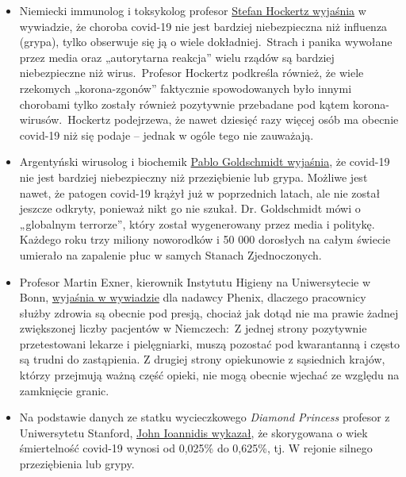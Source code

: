\begin{itemize}
\tightlist
\item
  Niemiecki immunolog i toksykolog profesor
  \href{https://www.youtube.com/watch?v=7wfb-B0BWmo}{Stefan Hockertz
  wyjaśnia} w wywiadzie, że choroba covid-19 nie jest bardziej
  niebezpieczna niż influenza (grypa), tylko obserwuje się ją o wiele
  dokładniej.~Strach i panika wywołane przez media oraz „autorytarna
  reakcja'' wielu rządów są bardziej niebezpieczne niż wirus.~Profesor
  Hockertz podkreśla również, że wiele rzekomych „korona-zgonów''
  faktycznie spowodowanych było innymi chorobami tylko zostały również
  pozytywnie przebadane pod kątem korona-wirusów.~Hockertz podejrzewa,
  że nawet dziesięć razy więcej osób ma obecnie covid-19 niż się podaje
  -- jednak w ogóle tego nie zauważają.
\item
  Argentyński wirusolog i biochemik
  \href{https://www.clarin.com/buena-vida/coronavirus-panico-injustificado-dice-virologo-argentino-francia_0_yVcmJ4RM.html}{Pablo
  Goldschmidt wyjaśnia}, że covid-19 nie jest bardziej niebezpieczny niż
  przeziębienie lub grypa. Możliwe jest nawet, że patogen covid-19
  krążył już w poprzednich latach, ale nie został jeszcze odkryty,
  ponieważ nikt go nie szukał. Dr. Goldschmidt mówi o „globalnym
  terrorze'', który został wygenerowany przez media i politykę. Każdego
  roku trzy miliony noworodków i 50 000 dorosłych na całym świecie
  umierało na zapalenie płuc w samych Stanach Zjednoczonych.
\item
  Profesor Martin Exner, kierownik Instytutu Higieny na Uniwersytecie w
  Bonn, \href{https://www.youtube.com/watch?v=9mI9trSm3PY}{wyjaśnia w
  wywiadzie} dla nadawcy Phenix, dlaczego pracownicy służby zdrowia są
  obecnie pod presją, chociaż jak dotąd nie ma prawie żadnej zwiększonej
  liczby pacjentów w Niemczech:~Z jednej strony pozytywnie przetestowani
  lekarze i pielęgniarki, muszą pozostać pod kwarantanną i często są
  trudni do zastąpienia. Z drugiej strony opiekunowie z sąsiednich
  krajów, którzy przejmują ważną część opieki, nie mogą obecnie wjechać
  ze względu na zamknięcie granic.
\item
  Na podstawie danych ze statku wycieczkowego \emph{Diamond Princess}
  profesor z Uniwersytetu Stanford,
  \href{https://www.statnews.com/2020/03/17/a-fiasco-in-the-making-as-the-coronavirus-pandemic-takes-hold-we-are-making-decisions-without-reliable-data/}{John
  Ioannidis wykazał}, że skorygowana o wiek śmiertelność covid-19 wynosi
  od 0,025\% do 0,625\%, tj. W rejonie silnego przeziębienia lub grypy.

\end{itemize}
